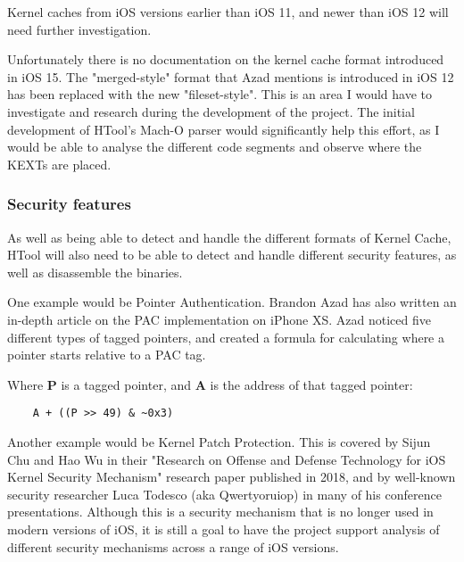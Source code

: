  Kernel caches from iOS versions earlier than iOS 11, and newer than iOS 12 will need further investigation. 
 
 Unfortunately there is no documentation on the kernel cache format introduced in iOS 15. The "merged-style" format that Azad mentions is introduced in iOS 12 has been replaced with the new "fileset-style". This is an area I would have to investigate and research during the development of the project. The initial development of HTool's Mach-O parser would significantly help this effort, as I would be able to analyse the different code segments and observe where the KEXTs are placed. 

 
 \subsubsection{Security features}
 
 As well as being able to detect and handle the different formats of Kernel Cache, HTool will also need to be able to detect and handle different security features, as well as disassemble the binaries. 
 
 One example would be Pointer Authentication. Brandon Azad has also written an in-depth article on the PAC implementation on iPhone XS\cite{azad-pac-indepth}. Azad noticed five different types of tagged pointers, and created a formula for calculating where a pointer starts relative to a PAC tag. 
 
 Where \textbf{P} is a tagged pointer, and \textbf{A} is the address of that tagged pointer:
 
 \begin{verbatim}
 	A + ((P >> 49) & ~0x3)
 \end{verbatim}
 
 Another example would be Kernel Patch Protection. This is covered by Sijun Chu and Hao Wu in their "Research on Offense and Defense Technology for iOS Kernel Security Mechanism"\cite{sijun-kernel-paper} research paper published in 2018, and by well-known security researcher Luca Todesco (aka Qwertyoruiop) in many of his conference presentations. Although this is a security mechanism that is no longer used in modern versions of iOS, it is still a goal to have the project support analysis of different security mechanisms across a range of iOS versions.
 
 
 
 
 
 
 
 
 
 
 
 
 
 
 
 
